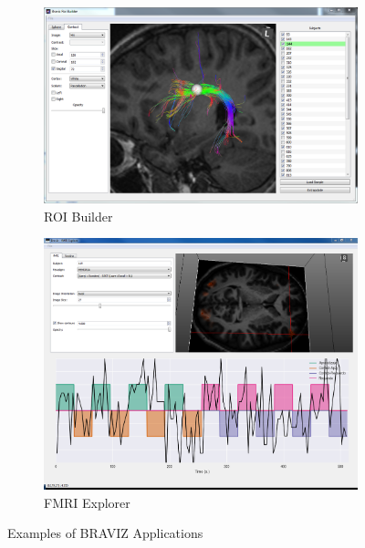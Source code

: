 \documentclass{frontiersHLTH}
\begin{document}
\begin{figure}
\begin{center}
\begin{subfigure}[b]{0.48\linewidth}
\includegraphics[width=\textwidth]{roi_builder}
\caption{ROI Builder\label{fig_roi}}
\end{subfigure}\hfill
\begin{subfigure}[b]{0.48\linewidth}
\includegraphics[width=\textwidth]{fmri}
\caption{FMRI Explorer\label{fig_fmri}}
\end{subfigure}
\end{center}
 \caption{\label{fig_other_apps} Examples of BRAVIZ Applications}
\end{figure}
\end{document}
